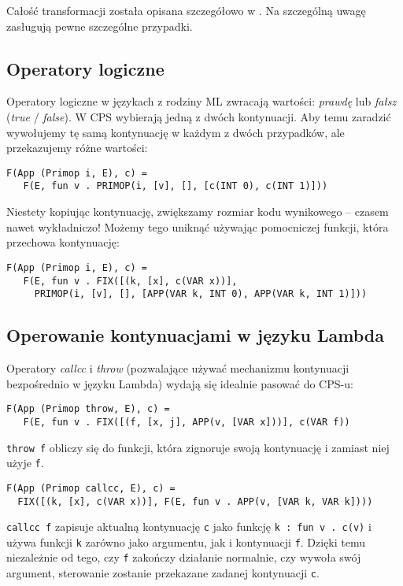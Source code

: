 \documentclass[11pt]{scrartcl}
\begin{document}
Całość transformacji została opisana szczegółowo w \cite[Conversion into CPS]{Appel}. Na szczególną uwagę
zasługują pewne szczególne przypadki.

\subsection{Operatory logiczne}
Operatory logiczne w językach z rodziny ML zwracają wartości: \textit{prawdę} lub \textit{fałsz}
(\textit{true} / \textit{false}). W CPS wybierają jedną z dwóch kontynuacji. Aby temu zaradzić
wywołujemy tę samą kontynuację w każdym z dwóch przypadków, ale przekazujemy
różne wartości:
\begin{lstlisting}
F(App (Primop i, E), c) =
   F(E, fun v . PRIMOP(i, [v], [], [c(INT 0), c(INT 1)]))
\end{lstlisting}

Niestety kopiując kontynuację, zwiększamy rozmiar kodu wynikowego -- czasem nawet
wykładniczo! Możemy tego uniknąć używając pomocniczej funkcji, która przechowa
kontynuację:
\begin{lstlisting}
F(App (Primop i, E), c) =
   F(E, fun v . FIX([(k, [x], c(VAR x))],
     PRIMOP(i, [v], [], [APP(VAR k, INT 0), APP(VAR k, INT 1)]))
\end{lstlisting}

\subsection{Operowanie kontynuacjami w języku Lambda}
Operatory \textit{callcc} i \textit{throw} (pozwalające używać mechanizmu kontynuacji bezpośrednio
w języku Lambda) wydają się idealnie pasować do CPS-u:
\begin{lstlisting}
F(App (Primop throw, E), c) =
   F(E, fun v . FIX([(f, [x, j], APP(v, [VAR x]))], c(VAR f))
\end{lstlisting}
\lstinline|throw f| obliczy się do funkcji, która zignoruje swoją kontynuację i zamiast niej
użyje \lstinline|f|.

\begin{lstlisting}
F(App (Primop callcc, E), c) =
  FIX([(k, [x], c(VAR x))], F(E, fun v . APP(v, [VAR k, VAR k])))
\end{lstlisting}
\lstinline|callcc f| zapisuje aktualną kontynuację \lstinline|c| jako funkcję \lstinline|k : fun v . c(v)| i używa
funkcji \lstinline|k| zarówno jako argumentu, jak i kontynuacji \lstinline|f|. Dzięki temu niezależnie
od tego, czy \lstinline|f| zakończy działanie normalnie, czy wywoła swój
argument, sterowanie zostanie przekazane zadanej kontynuacji \lstinline|c|.
\end{document}
